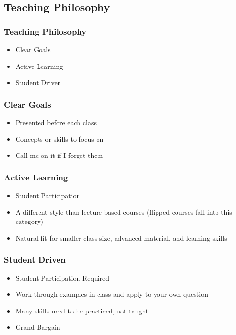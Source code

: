 \documentclass[14pt]{beamer}
\begin{document}
\subsection{Teaching Philosophy}
\begin{frame}
\frametitle{Teaching Philosophy}
\begin{itemize}
	\item Clear Goals
	\item Active Learning
	\item Student Driven
\end{itemize}

\end{frame}
\begin{frame}
\frametitle{Clear Goals}
\begin{itemize}
	\item Presented before each class
	\item Concepts or skills to focus on
	\item Call me on it if I forget them
\end{itemize}
%
\end{frame}
\begin{frame}
\frametitle{Active Learning}
\begin{itemize}
	\item Student Participation
	\item A different style than lecture-based courses (flipped courses fall into this category)
	\item Natural fit for smaller class size, advanced material, and learning skills
\end{itemize}

%
\end{frame}
\begin{frame}
\frametitle{Student Driven}
\begin{itemize}
	\item Student Participation Required
	\item Work through examples in class and apply to your own question
	\item Many skills need to be practiced, not taught
	\item Grand Bargain
\end{itemize}

\end{frame}
\end{document}
